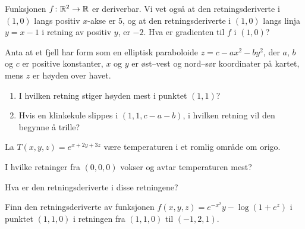 
\oppgave[V2015, Oppgave 2]

Funksjonen $f \colon \mathbb{R}^2 \to \mathbb{R}$ er deriverbar. Vi vet også at den
retningsderiverte i $(1, 0)$ langs positiv $x$-akse er $5$, og at den
retningsderiverte i $(1, 0)$ langs linja $y = x - 1$ i retning av positiv $y$,
er $- 2$. Hva er gradienten til $f$ i $(1, 0)$?

\oppgave[K2014, Oppgave 5]

Anta at et fjell har form som en elliptisk paraboloide $z = c - ax^2 - by^2$,
der $a$, $b$ og $c$ er positive konstanter, $x$ og $y$ er øst–vest og nord–sør
koordinater på kartet, mens $z$ er høyden over havet.
%
\begin{enumerate}
  \item I hvilken retning stiger høyden mest i punktet $(1, 1)$?
  \item Hvis en klinkekule slippes i $(1, 1, c - a - b)$, i hvilken retning vil den begynne
    å trille?
\end{enumerate}

\oppgave[V2014, Oppgave 2]

La $T(x,y,z) = e^{x + 2y + 3z}$ være temperaturen i et romlig område om origo.
\medskip

I hvilke retninger fra $(0,0,0)$ vokser og avtar temperaturen mest? \medskip

Hva er den retningsderiverte i disse retningene?

\oppgave[V2012, Oppgave 2] Finn den retningsderiverte av funksjonen $f(x,y,z) =
e^{-x^2}y - \log(1 + e^z)$ i punktet $(1,1,0)$ i retningen fra $(1,1,0)$ til $(-1,2,1)$.